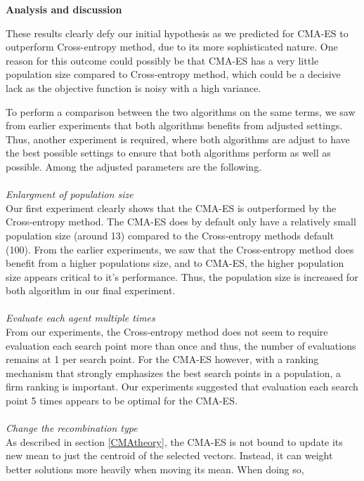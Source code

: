 \textbf{Analysis and discussion}

These results clearly defy our initial hypothesis as we predicted
for CMA-ES to outperform Cross-entropy method, due to its more sophisticated nature. 
One reason for this outcome could possibly be that
CMA-ES has a very little population size compared to Cross-entropy method,
which could be a decisive lack as the objective function is noisy with 
a high variance.\\

\begin{changebar}
To perform a comparison between the two algorithms on the same terms,
we saw from earlier experiments that both algorithms benefits from 
adjusted settings. Thus, another experiment is required, where both algorithms
are adjust to have the best possible settings to ensure that both algorithms
perform as well as possible. Among the adjusted parameters are the following.\\
\\
\textit{Enlargment of population size}\\
Our first experiment clearly shows that the CMA-ES
is outperformed by the Cross-entropy method.
The CMA-ES does by default only have a relatively small
population size (around 13) compared to the Cross-entropy methods
default (100). From the earlier experiments, we saw that 
the Cross-entropy method does benefit from a higher populations size,
and to CMA-ES, the higher population size appears critical
to it's performance. Thus, the population size is increased for 
both algorithm in our final experiment.\\
\\
\textit{Evaluate each agent multiple times}\\
From our experiments, the Cross-entropy method does not
seem to require evaluation each search point more than once
and thus, the number of evaluations remains at 1 per
search point. For the CMA-ES however, with a 
ranking mechanism that strongly emphasizes 
the best search points in a population, a firm
ranking is important. Our experiments suggested that
evaluation each search point 5 times appears to be optimal 
for the CMA-ES.\\
\\
\textit{Change the recombination type}\\
As described in section \ref{CMAtheory}, 
the CMA-ES is not bound to update its 
new mean to just the centroid of the selected 
vectors. Instead, it can weight better solutions
more heavily when moving its mean. When doing so,

\end{changebar}
